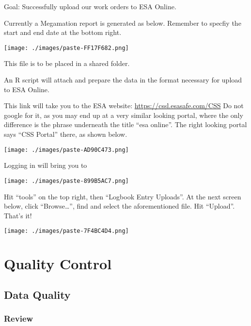 \documentclass[
  letterpaper,
  DIV=11,
  numbers=noendperiod,
  oneside]{scrreprt}
\begin{document}
Goal: Successfully upload our work orders to ESA Online.

Currently a Megamation report is generated as below. Remember to specfiy
the start and end date at the bottom right.

\texttt{[image: ./images/paste-FF17F682.png]}

This file is to be placed in a shared folder.

An R script will attach and prepare the data in the format necessary for
upload to ESA Online.

This link will take you to the ESA website:
\url{https://cssl.esasafe.com/CSS} Do not google for it, as you may end
up at a very similar looking portal, where the only difference is the
phrase underneath the title ``esa online''. The right looking portal
says ``CSS Portal'' there, as shown below.

\texttt{[image: ./images/paste-AD90C473.png]}

Logging in will bring you to

\texttt{[image: ./images/paste-899B5AC7.png]}

Hit ``tools'' on the top right, then ``Logbook Entry Uploads''. At the
next screen below, click ``Browse\ldots{}'', find and select the
aforementioned file. Hit ``Upload''. That's it!

\texttt{[image: ./images/paste-7F4BC4D4.png]}

\part{Quality Control}

\hypertarget{data-quality}{%
\chapter{Data Quality}\label{data-quality}}

\hypertarget{review}{%
\section{Review}\label{review}}
\end{document}
